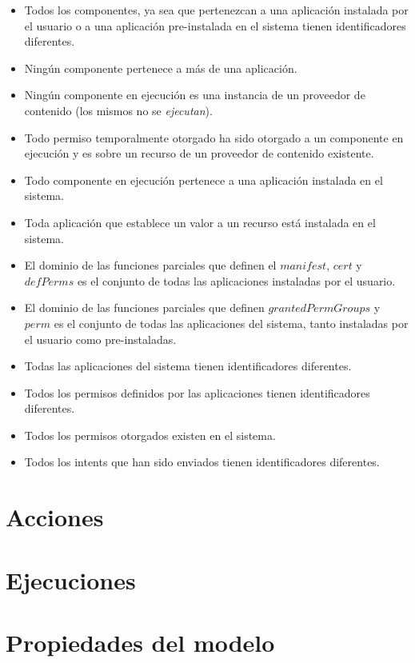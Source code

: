 \begin{itemize}
    \item Todos los componentes, ya sea que pertenezcan a una aplicación instalada por el usuario o a
    una aplicación pre-instalada en el sistema tienen identificadores diferentes.
    \item Ningún componente pertenece a más de una aplicación.
    \item Ningún componente en ejecución es una instancia de un proveedor de contenido (los mismos no se \textit{ejecutan}).
    \item Todo permiso temporalmente otorgado ha sido otorgado a un componente en ejecución y es sobre
    un recurso de un proveedor de contenido existente.
    \item Todo componente en ejecución pertenece a una aplicación instalada en el sistema.
    \item Toda aplicación que establece un valor a un recurso está instalada en el sistema.
    \item El dominio de las funciones parciales que definen el $manifest$, $cert$ y $defPerms$ es el
    conjunto de todas las aplicaciones instaladas por el usuario.
    \item El dominio de las funciones parciales que definen $grantedPermGroups$ y $perm$ es el
    conjunto de todas las aplicaciones del sistema, tanto instaladas por el usuario como
    pre-instaladas.
    \item Todas las aplicaciones del sistema tienen identificadores diferentes.
    \item Todos los permisos definidos por las aplicaciones tienen identificadores diferentes.
    \item Todos los permisos otorgados existen en el sistema.
    \item Todos los intents que han sido enviados tienen identificadores diferentes.
\end{itemize}

\section{Acciones}

\section{Ejecuciones}

\section{Propiedades del modelo}